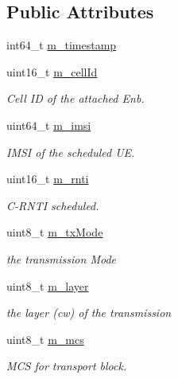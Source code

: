 \subsection*{Public Attributes}
\begin{DoxyCompactItemize}
\item 
int64\+\_\+t \hyperlink{structns3_1_1PhyReceptionStatParameters_aea5173dcf64357e0eb2bfeaf3d8755d0}{m\+\_\+timestamp}
\item 
uint16\+\_\+t \hyperlink{structns3_1_1PhyReceptionStatParameters_a9c2552630406c7f857440ec75905016e}{m\+\_\+cell\+Id}
\begin{DoxyCompactList}\small\item\em Cell ID of the attached Enb. \end{DoxyCompactList}\item 
uint64\+\_\+t \hyperlink{structns3_1_1PhyReceptionStatParameters_a59144e2126c9d52d7b1d5fb6412320c3}{m\+\_\+imsi}
\begin{DoxyCompactList}\small\item\em I\+M\+SI of the scheduled UE. \end{DoxyCompactList}\item 
uint16\+\_\+t \hyperlink{structns3_1_1PhyReceptionStatParameters_a7413a05de70354099522d41ef794f5ab}{m\+\_\+rnti}
\begin{DoxyCompactList}\small\item\em C-\/\+R\+N\+TI scheduled. \end{DoxyCompactList}\item 
uint8\+\_\+t \hyperlink{structns3_1_1PhyReceptionStatParameters_a0be64ea75aee89d9cd9dc063c87a9c34}{m\+\_\+tx\+Mode}
\begin{DoxyCompactList}\small\item\em the transmission Mode \end{DoxyCompactList}\item 
uint8\+\_\+t \hyperlink{structns3_1_1PhyReceptionStatParameters_a580e50a33b89b81ab5e19dd62f084961}{m\+\_\+layer}
\begin{DoxyCompactList}\small\item\em the layer (cw) of the transmission \end{DoxyCompactList}\item 
uint8\+\_\+t \hyperlink{structns3_1_1PhyReceptionStatParameters_ae4e4ce7aa7d9d87b0c7767f62921095c}{m\+\_\+mcs}
\begin{DoxyCompactList}\small\item\em M\+CS for transport block. \end{DoxyCompactList}\item 

\end{DoxyCompactItemize}

